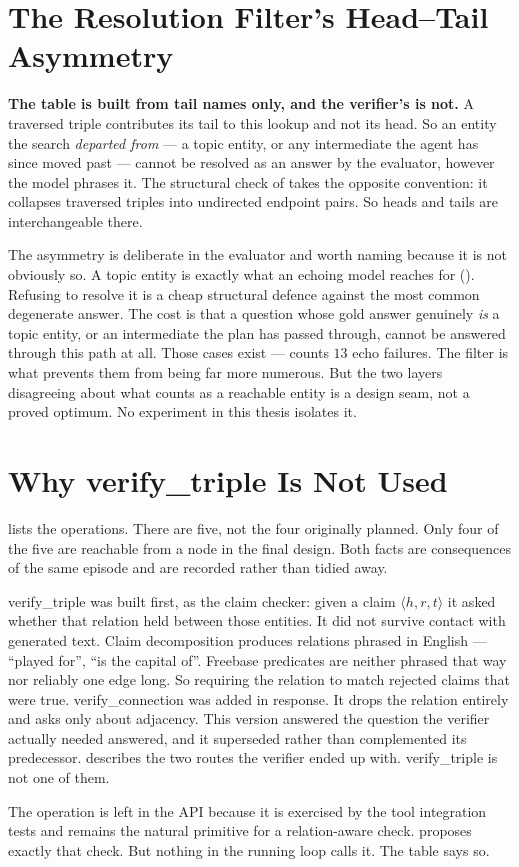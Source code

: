 \section{The Resolution Filter's Head--Tail
Asymmetry}\label{app:filter-asymmetry}

\textbf{The table is built from tail names only, and the verifier's is not.} A
traversed triple contributes its tail to this lookup and not its head. So an
entity the search \emph{departed from} --- a topic entity, or any intermediate
the agent has since moved past --- cannot be resolved as an answer by the
evaluator, however the model phrases it. The structural check of
 takes the opposite convention: it collapses
traversed triples into undirected endpoint pairs. So heads and tails are
interchangeable there.

The asymmetry is deliberate in the evaluator and worth naming because it is not
obviously so. A topic entity is exactly what an echoing model reaches for
(). Refusing to resolve it is a cheap structural defence against
the most common degenerate answer. The cost is that a question whose gold
answer genuinely \emph{is} a topic entity, or an intermediate the plan has
passed through, cannot be answered through this path at all. Those cases
exist ---  counts $13$ \textsf{echo} failures. The filter is
what prevents them from being far more numerous. But the two layers
disagreeing about what counts as a reachable entity is a design seam, not a
proved optimum. No experiment in this thesis isolates it.


\section{Why verify\_triple Is Not Used}\label{app:verify-triple}

 lists the operations. There are five, not the four originally
planned. Only four of the five are reachable from a node in the final design.
Both facts are consequences of the same episode and are recorded rather than
tidied away.

\textsf{verify\_triple} was built first, as the claim checker: given a claim
$\langle h, r, t\rangle$ it asked whether that relation held between those
entities. It did not survive contact with generated text. Claim decomposition
produces relations phrased in English --- ``played for'', ``is the capital
of''. Freebase predicates are neither phrased that way nor reliably one edge
long. So requiring the relation to match rejected claims that were true.
\textsf{verify\_connection}
was added in response. It drops the relation entirely and asks only about
adjacency. This version answered the question the verifier actually needed
answered, and it superseded rather than complemented its predecessor.
 describes the two routes the verifier ended up
with. \textsf{verify\_triple} is not one of them.

The operation is left in the API because it is exercised by the tool
integration tests and remains the natural primitive for a relation-aware
check.  proposes exactly that check. But nothing in the
running loop calls it. The table says so.

\endinput
